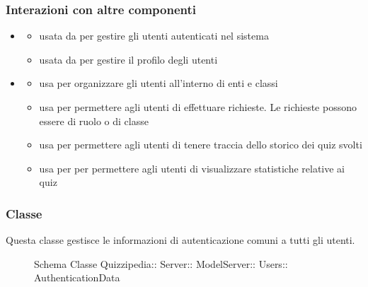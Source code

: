 \subsubsection{Interazioni con altre componenti}
\begin{itemize}
\item {}
\begin{itemize}
\item usata da  per gestire gli utenti autenticati nel sistema
\item usata da  per gestire il profilo degli utenti
\end{itemize}
\item {}
\begin{itemize}
\item usa  per organizzare gli utenti all'interno di enti e classi
\item usa  per permettere agli utenti di effettuare richieste. Le richieste possono essere di ruolo o di classe
\item usa  per permettere agli utenti di tenere traccia dello storico dei quiz svolti
\item usa  per per permettere agli utenti di visualizzare statistiche relative ai quiz
\end{itemize}
\end{itemize}
\subsubsection{Classe }
Questa classe gestisce le informazioni di autenticazione comuni a tutti gli utenti.
\begin{figure}[H]
\centering
\noindent{}
\caption[Schema Classe AuthenticationData]{Schema Classe Quizzipedia:: Server:: ModelServer:: Users:: AuthenticationData}
\end{figure}
